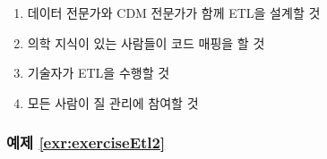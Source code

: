 \documentclass[11pt]{book}
\providecommand{\tightlist}{%
  \setlength{\itemsep}{0pt}\setlength{\parskip}{0pt}}
\theoremstyle{definition}
\theoremstyle{definition}
\theoremstyle{definition}
\theoremstyle{remark}
\begin{document}
\begin{enumerate}
\def\labelenumi{\Alph{enumi})}
\tightlist
\item
  데이터 전문가와 CDM 전문가가 함께 ETL을 설계할 것
\item
  의학 지식이 있는 사람들이 코드 매핑을 할 것
\item
  기술자가 ETL을 수행할 것
\item
  모든 사람이 질 관리에 참여할 것
\end{enumerate}

\subsubsection*{예제 \ref{exr:exerciseEtl2}}\label{-refexrexerciseetl2}
\end{document}
